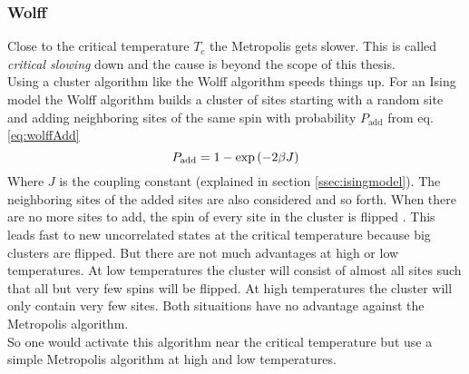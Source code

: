     \subsubsection{Wolff}
        Close to the critical temperature \(T_c\) the Metropolis
        gets slower. This is called \emph{critical slowing} down and the
        cause is beyond the scope of this thesis.\\
        Using a cluster algorithm like the Wolff
        algorithm \cite{Wolff1989} speeds things up.
        For an Ising model the Wolff algorithm builds a cluster of sites
        starting with a random site and adding neighboring sites of the
        same spin with probability \(P_{\mathrm{add}}\) from eq. \eqref{eq:wolffAdd}
        \begin{equation}
            P_{\mathrm{add}} = 1-\exp\left(-2\beta J\right)
            \label{eq:wolffAdd}
        \end{equation}
        Where \(J\) is the coupling constant (explained in section
        \ref{ssec:isingmodel}). The neighboring sites of the added sites
        are also considered and so forth. When there are no more sites
        to add, the spin of every site in the cluster is flipped
        \cite[S. ??]{NewmanBarkema1999} \cite[S. 151f]{Katzgraber2011}.
        This leads fast to new uncorrelated states at the critical
        temperature because big clusters are flipped. But there are not
        much advantages at high or low temperatures. At low temperatures
        the cluster will consist of almost all sites such that all but
        very few spins will be flipped. At high temperatures the cluster
        will only contain very few sites.
        Both situaitions have no advantage against the Metropolis algorithm.\\
        So one would activate this algorithm near the critical temperature
        but use a simple Metropolis algorithm at high and low temperatures.

